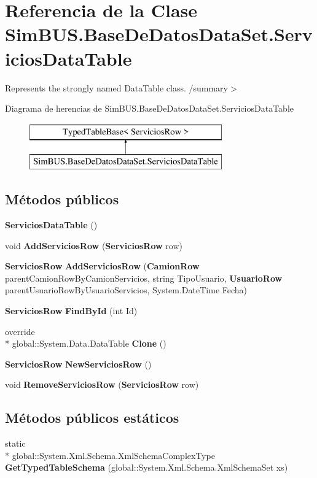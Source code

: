 \section{Referencia de la Clase Sim\-B\-U\-S.\-Base\-De\-Datos\-Data\-Set.\-Servicios\-Data\-Table}
\label{class_sim_b_u_s_1_1_base_de_datos_data_set_1_1_servicios_data_table}


Represents the strongly named Data\-Table class. /summary$>$  


Diagrama de herencias de Sim\-B\-U\-S.\-Base\-De\-Datos\-Data\-Set.\-Servicios\-Data\-Table\begin{figure}[H]
\begin{center}
\leavevmode
\includegraphics[height=2.000000cm]{class_sim_b_u_s_1_1_base_de_datos_data_set_1_1_servicios_data_table}
\end{center}
\end{figure}
\subsection*{Métodos públicos}
\begin{DoxyCompactItemize}
\item 
{\bf Servicios\-Data\-Table} ()
\item 
void {\bf Add\-Servicios\-Row} ({\bf Servicios\-Row} row)
\item 
{\bf Servicios\-Row} {\bf Add\-Servicios\-Row} ({\bf Camion\-Row} parent\-Camion\-Row\-By\-Camion\-Servicios, string Tipo\-Usuario, {\bf Usuario\-Row} parent\-Usuario\-Row\-By\-Usuario\-Servicios, System.\-Date\-Time Fecha)
\item 
{\bf Servicios\-Row} {\bf Find\-By\-Id} (int Id)
\item 
override \\*
global\-::\-System.\-Data.\-Data\-Table {\bf Clone} ()
\item 
{\bf Servicios\-Row} {\bf New\-Servicios\-Row} ()
\item 
void {\bf Remove\-Servicios\-Row} ({\bf Servicios\-Row} row)
\end{DoxyCompactItemize}
\subsection*{Métodos públicos estáticos}
\begin{DoxyCompactItemize}
\item 
static \\*
global\-::\-System.\-Xml.\-Schema.\-Xml\-Schema\-Complex\-Type {\bf Get\-Typed\-Table\-Schema} (global\-::\-System.\-Xml.\-Schema.\-Xml\-Schema\-Set xs)
\end{DoxyCompactItemize}
